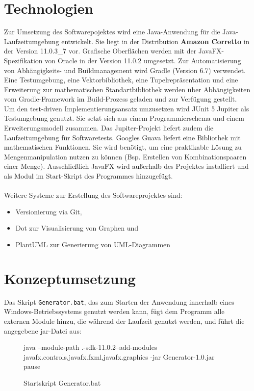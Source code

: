 \section{Technologien}
Zur Umsetzung des Softwarepojektes wird eine Java-Anwendung für die Java-Laufzeitumgebung entwickelt.
Sie liegt in der Distribution \textbf{Amazon Corretto} in der Version 11.0.3\_7 vor.
Grafische Oberflächen werden mit der JavaFX-Spezifikation von Oracle in der Version 11.0.2 umgesetzt.
Zur Automatisierung von Abhängigkeits- und Buildmanagement wird Gradle (Version 6.7) verwendet.
Eine Testumgebung, eine Vektorbibliothek, eine Tupelrepräsentation und eine Erweiterung zur mathematischen
Standartbibliothek werden über Abhängigkeiten vom Gradle-Framework im Build-Prozess geladen und zur Verfügung
gestellt.\\
Um den test-driven Implementierungsansatz umzusetzen wird JUnit 5 Jupiter als Testumgebung genutzt.
Sie setzt sich aus einem Programmierschema und einem Erweiterungsmodell zusammen.
Das Jupiter-Projekt liefert zudem die Laufzeitumgebung für Softwaretests.
Googles Guava liefert eine Bibliothek mit mathematischen Funktionen.
Sie wird benötigt, um eine praktikable Lösung zu Mengenmanipulation nutzen zu können (Bsp. Erstellen
von Kombinationspaaren einer Menge).
Ausschließlich JavaFX wird außerhalb des Projektes installiert und als Modul im Start-Skript des Programmes
hinzugefügt.
\\~\\
Weitere Systeme zur Erstellung des Softwareprojektes sind:
\begin{itemize}
    \item Versionierung via Git,
    \item Dot zur Visualisierung von Graphen und
    \item PlantUML zur Generierung von UML-Diagrammen
\end{itemize}

\newpage

\section{Konzeptumsetzung}

Das Skript \texttt{Generator.bat}, das zum Starten der Anwendung innerhalb eines Windows-Betriebssystems genutzt werden kann,
fügt dem Programm alle externen Module hinzu, die während der Laufzeit genutzt werden, und führt die angegebene jar-Datei aus:
\begin{figure}[H]
    \centering
    \begin{csource}
    java --module-path .\javafx-sdk-11.0.2\lib --add-modules javafx.controls,javafx.fxml,javafx.graphics -jar Generator-1.0.jar
    pause
    \end{csource}
    \caption{Startskript Generator.bat}
\end{figure}


